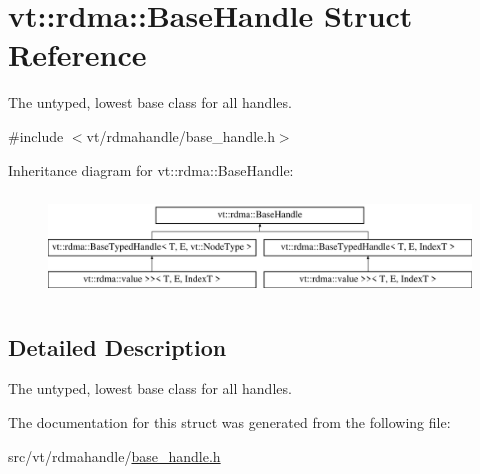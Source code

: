 \hypertarget{structvt_1_1rdma_1_1_base_handle}{}\section{vt\+:\+:rdma\+:\+:Base\+Handle Struct Reference}
\label{structvt_1_1rdma_1_1_base_handle}


The untyped, lowest base class for all handles.  




{\ttfamily \#include $<$vt/rdmahandle/base\+\_\+handle.\+h$>$}

Inheritance diagram for vt\+:\+:rdma\+:\+:Base\+Handle\+:\begin{figure}[H]
\begin{center}
\leavevmode
\includegraphics[height=2.763158cm]{structvt_1_1rdma_1_1_base_handle}
\end{center}
\end{figure}


\subsection{Detailed Description}
The untyped, lowest base class for all handles. 

The documentation for this struct was generated from the following file\+:\begin{DoxyCompactItemize}
\item 
src/vt/rdmahandle/\hyperlink{base__handle_8h}{base\+\_\+handle.\+h}\end{DoxyCompactItemize}
